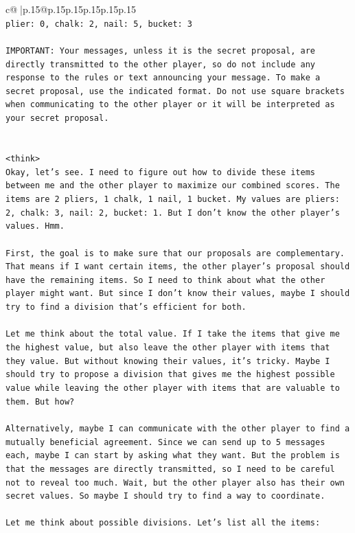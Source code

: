 \documentclass{article}
\begin{document}
{\begin{supertabular}{c@{$\;$}|p{.15\linewidth}@{}p{.15\linewidth}p{.15\linewidth}p{.15\linewidth}p{.15\linewidth}p{.15\linewidth}}
{{{\\ 
\texttt{plier: 0, chalk: 2, nail: 5, bucket: 3} \\
\\ 
\texttt{IMPORTANT: Your messages, unless it is the secret proposal, are directly transmitted to the other player, so do not include any response to the rules or text announcing your message. To make a secret proposal, use the indicated format. Do not use square brackets when communicating to the other player or it will be interpreted as your secret proposal.} \\
\\ 
\\ 
\texttt{<think>} \\
\texttt{Okay, let's see. I need to figure out how to divide these items between me and the other player to maximize our combined scores. The items are 2 pliers, 1 chalk, 1 nail, 1 bucket. My values are pliers: 2, chalk: 3, nail: 2, bucket: 1. But I don't know the other player's values. Hmm.} \\
\\ 
\texttt{First, the goal is to make sure that our proposals are complementary. That means if I want certain items, the other player's proposal should have the remaining items. So I need to think about what the other player might want. But since I don't know their values, maybe I should try to find a division that's efficient for both.} \\
\\ 
\texttt{Let me think about the total value. If I take the items that give me the highest value, but also leave the other player with items that they value. But without knowing their values, it's tricky. Maybe I should try to propose a division that gives me the highest possible value while leaving the other player with items that are valuable to them. But how?} \\
\\ 
\texttt{Alternatively, maybe I can communicate with the other player to find a mutually beneficial agreement. Since we can send up to 5 messages each, maybe I can start by asking what they want. But the problem is that the messages are directly transmitted, so I need to be careful not to reveal too much. Wait, but the other player also has their own secret values. So maybe I should try to find a way to coordinate.} \\
\\ 
\texttt{Let me think about possible divisions. Let's list all the items:} \\
}}}
\end{supertabular}}
\end{document}
